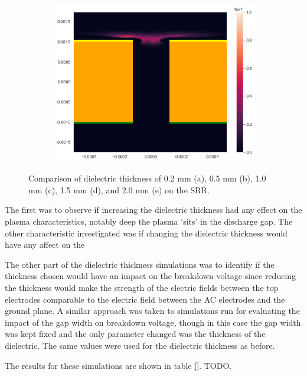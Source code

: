 \begin{figure}[h!]
\begin{subfigure}[b]{0.475\textwidth}
        \centering 
        \includegraphics[width=\textwidth]{chapter_4/figures/SRR_dielectric_5.png}
        \caption{}    
        \label{fig:SRR_dielectric_2.0mm}
    \end{subfigure}
    \caption[]
    {\small Comparison of dielectric thickness of 0.2 mm (a), 0.5 mm (b), 1.0 mm (c), 1.5 mm (d), and 2.0 mm (e) on the SRR.} 
    \label{fig:SRR_dielectric_comparison_stabilise}
\end{figure}


The first was to observe if increasing the dielectric thickness had any effect on the plasma characteristics, notably deep the plasma `sits' in the discharge gap. The other characteristic investigated was if changing the dielectric thickness would have any affect on the 

The other part of the dielectric thickness simulations was to identify if the thickness chosen would have an impact on the breakdown voltage since reducing the thickness would make the strength of the electric fields between the top electrodes comparable to the electric field between the AC electrodes and the ground plane. A similar approach was taken to simulations run for evaluating the impact of the gap width on breakdown voltage, though in this case the gap width was kept fixed and the only parameter changed was the thickness of the dielectric. The same values were used for the dielectric thickness as before.


The results for these simulations are shown in table \ref{}. TODO.



